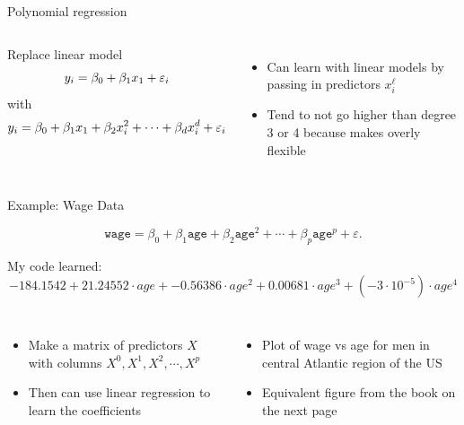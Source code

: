 \documentclass[aspectratio=169,usenames,dvipsnames]{beamer}
\newcommand{\InstructorList}[1]{
\begin{itemize}
	\color{orange}
	#1
\end{itemize}
}
\begin{document}
\begin{frame}[c]{Polynomial regression}

\begin{columns}
\centering
Replace linear model
\begin{equation*}
	y_i = \beta_0 + \beta_1x_1 + \varepsilon_i
\end{equation*}
with
\begin{equation*}
	y_i = \beta_0 + \beta_1x_1 + \beta_2x_i^2 + \cdots + \beta_dx_i^d + \varepsilon_i
\end{equation*}

\centering
\InstructorList{
  \item Can learn with linear models by passing in predictors $x_i^\ell$
	\item Tend to not go higher than degree 3 or 4 because makes overly flexible
}

\end{columns}

\end{frame}
\begin{frame}[t]{Example: Wage Data}

	$$
\texttt{wage} = \beta_0 + \beta_1 \texttt{age} + \beta_2 \texttt{age}^2 + \cdots + \beta_p \texttt{age}^p +\varepsilon.
$$

   My code learned:
  $$
  -184.1542 + 21.24552 \cdot age + -0.56386 \cdot age^2 + 0.00681 \cdot age^3 + (-3\cdot 10^{-5}) \cdot age^4
  $$

\begin{columns}
\centering

\InstructorList{
	\item Make a matrix of predictors $X$ with columns $X^0, X^1, X^2, \cdots, X^p$
	\item Then can use linear regression to learn the coefficients
}
	
\centering
\InstructorList{
  \item Plot of wage vs age for men in central Atlantic region of the US
  \item Equivalent figure from the book on the next page
}
\end{columns}

\end{frame}
\end{document}
